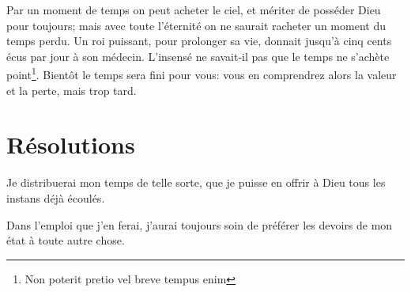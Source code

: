 \documentclass[instructions.tex]{subfiles}
\begin{document}
Par un moment de temps on peut acheter le ciel, et mériter de posséder Dieu pour toujours; mais avec toute l'éternité on ne saurait racheter un moment du temps perdu. Un roi puissant, pour prolonger sa vie, donnait jusqu'à cinq cents écus par jour à son médecin. L'insensé ne savait-il pas que le temps ne s'achète point\footnote{Non poterit pretio vel breve tempus enim}. Bientôt le temps sera fini pour vous: vous en comprendrez alors la valeur et la perte, mais trop tard.


\section{Résolutions}

\primo Je distribuerai mon temps de telle sorte, que je puisse en offrir à Dieu tous les instans déjà écoulés. 

\secundo Dans l'emploi que j'en ferai, j'aurai toujours soin de préférer les devoirs de mon état à toute autre chose. 

\end{document}
